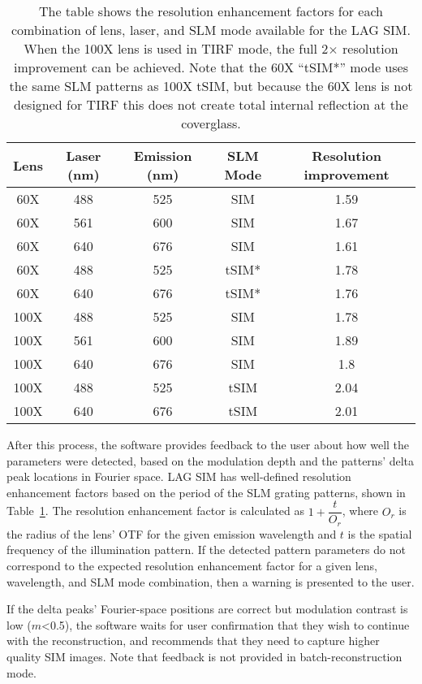 \begin{table}[h!]
\caption[LAG SIM: Different combinations of lenses, wavelengths, and SLM grating patterns provide different resolution enhancement factors]{\label{tab:resolution}The table shows the resolution enhancement factors for each combination of lens, laser, and SLM mode available for the LAG SIM. When the 100X lens is used in TIRF mode, the full 2$\times$ resolution improvement can be achieved. Note that the 60X ``tSIM*'' mode uses the same SLM patterns as 100X tSIM, but because the 60X lens is not designed for TIRF this does not create total internal reflection at the coverglass. }
\centering
\begin{tabular}{|c|c|c|c|c|}
\hline
Lens &	Laser (nm) &	Emission (nm) & SLM Mode & Resolution improvement \\ \hline
60X &	488 &	525 &	SIM &	1.59 \\
60X &	561 &	600 &	SIM &	1.67 \\
60X &	640 &	676 &	SIM &	1.61 \\
60X &	488 &	525 &	tSIM* &	1.78 \\
60X &	640 &	676 &	tSIM* &	1.76 \\
100X &	488 &	525 &	SIM &	1.78 \\
100X &	561 &	600 &	SIM &	1.89 \\
100X &	640 &	676 &	SIM &	1.8 \\
100X &	488 &	525 &	tSIM &	2.04 \\
100X &	640 &	676 &	tSIM &	2.01 \\ \hline
\end{tabular}
\end{table}

After this process, the software provides feedback to the user about how well the parameters were detected, based on the modulation depth and the patterns' delta peak locations in Fourier space.
LAG SIM has well-defined resolution enhancement factors based on the period of the SLM grating patterns, shown in Table~\ref{tab:resolution}.
The resolution enhancement factor is calculated as $1 + \dfrac{t}{O_r}$, where $O_r$ is the radius of the lens' OTF for the given emission wavelength and $t$ is the spatial frequency of the illumination pattern.
If the detected pattern parameters do not correspond to the expected resolution enhancement factor for a given lens, wavelength, and SLM mode combination, then a warning is presented to the user.

If the delta peaks' Fourier-space positions are correct but modulation contrast is low ($m$<0.5), the software waits for user confirmation that they wish to continue with the reconstruction, and recommends that they need to capture higher quality SIM images.
Note that feedback is not provided in batch-reconstruction mode.

